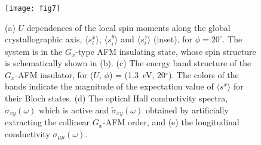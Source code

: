 \documentclass[aps,twocolumn,prb,preprintnumbers,amsmath,amssymb]{revtex4-2}
\begin{document}
\begin{figure}
\begin{center}
\texttt{[image: fig7]}
\end{center}\caption{
(a) $U$ dependences of the local spin moments along the global crystallographic axis, $\langle s_i^x \rangle$, $\langle s_i^y \rangle$ and $\langle s_i^z \rangle$ (inset), for $\phi=20^\circ$. The system is in the $G_x$-type AFM insulating state, whose spin structure is schematically shown in (b).
(c) The energy band structure of the $G_x$-AFM insulator, for ($U$, $\phi$) =  (1.3~eV, 20$^\circ$).
The colors of the bands indicate the magnitude of the expectation value of $\langle s^x \rangle$ for their Bloch states. 
(d) The optical Hall conductivity spectra, $\sigma_{xy}(\omega)$ which is active and $\tilde{\sigma}_{xy}(\omega)$ obtained by artificially extracting the collinear $G_x$-AFM order, and (e) the longitudinal conductivity $\sigma_{\mu\mu}(\omega)$.
}
\label{fig7}
\end{figure}
\end{document}
